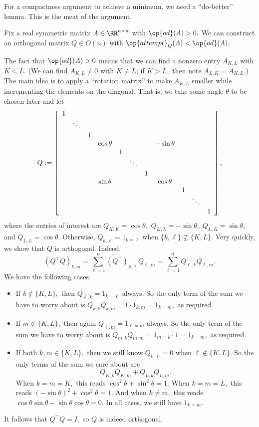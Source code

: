 For a compactness argument to achieve a minimum, we need a ``do-better'' lemma. This is the meat of the argument.
\begin{lemma}
    Fix a real symmetric matrix $A\in\RR^{n\times n}$ with $\op{od}(A)>0.$ We can construct an orthogonal matrix $Q\in O(n)$ with $\op{attempt}_Q(A)<\op{od}(A).$
\end{lemma}
The fact that $\op{od}(A)>0$ means that we can find a nonzero entry $A_{K,L}$ with $K<L.$ (We can find $A_{K,L}\ne0$ with $K\ne L$; if $K>L,$ then note $A_{L,K}=A_{K,L}.$) The main idea is to apply a ``rotation matrix'' to make $A_{K,L}$ smaller while incrementing the elements on the diagonal. That is, we take some angle $\theta$ to be chosen later and let
\[Q:=\left[\begin{array}{*{20}c}
    1 \\
    & \ddots \\
    & & 1 \\
    & & & \cos\theta & & & & -\sin\theta \\
    & & & & 1 \\
    & & & & & \ddots \\
    & & & & & & 1 \\
    & & & \sin\theta & & & & \cos\theta \\
    & & & & & & & & 1 \\
    & & & & & & & & & \ddots & \\
    & & & & & & & & & & 1 \\
\end{array}\right],\]
where the entries of interest are $Q_{K,K}=\cos\theta,$ $Q_{K,L}=-\sin\theta,$ $Q_{L,K}=\sin\theta,$ and $Q_{L,L}=\cos\theta.$ Otherwise, $Q_{k,\ell}=1_{k=\ell}$ when $\{k,\ell\}\not\subseteq\{K,L\}.$ Very quickly, we show that $Q$ is orthogonal. Indeed,
\[\left(Q^\intercal Q\right)_{k,m}=\sum_{\ell=1}^n\left(Q^\intercal\right)_{k,\ell}Q_{\ell,m}=\sum_{\ell=1}^nQ_{\ell,k}Q_{\ell,m}.\]
We have the following cases.
\begin{itemize}
    \item If $k\not\in\{K,L\},$ then $Q_{\ell,k}=1_{k=\ell}$ always. So the only term of the sum we have to worry about is $Q_{k,k}Q_{k,m}=1\cdot 1_{k,m}=1_{k=m},$ as required.
    \item If $m\not\in\{K,L\},$ then again $Q_{\ell,m}=1_{\ell=m}$ always. So the only term of the sum we have to worry about is $Q_{m,k}Q_{m,m}=1_{m=k}\cdot1=1_{k=m},$ as required.
    \item If both $k,m\in\{K,L\},$ then we still know $Q_{k,\ell}=0$ when $\ell\not\in\{K,L\}.$ So the only terms of the sum we care about are
    \[Q_{K,k}Q_{K,m}+Q_{L,k}Q_{L,m}.\]
    When $k=m=K,$ this reads $\cos^2\theta+\sin^2\theta=1.$ When $k=m=L,$ this reads $(-\sin\theta)^2+\cos^2\theta=1.$ And when $k\ne m,$ this reads $\cos\theta\sin\theta-\sin\theta\cos\theta=0.$ In all cases, we still have $1_{k=m}.$
\end{itemize}
It follows that $Q^\intercal Q=I,$ so $Q$ is indeed orthogonal.

